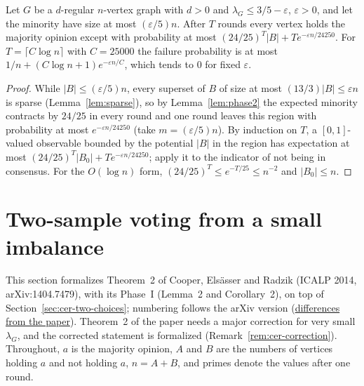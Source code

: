 \begin{theorem}[Theorem~4]\label{thm:expander}
\leanok{}
Let $G$ be a $d$-regular $n$-vertex graph with $d>0$ and $\lambda_G\le3/5-\varepsilon$, $\varepsilon>0$,
and let the minority have size at most $(\varepsilon/5)n$. After $T$ rounds every vertex holds
the majority opinion except with probability at most
$(24/25)^T|B|+Te^{-\varepsilon n/24250}$. For $T=\lceil C\log n\rceil$ with $C=25000$ the failure
probability is at most $1/n+(C\log n+1)e^{-\varepsilon n/C}$, which tends to $0$ for fixed
$\varepsilon$.
\end{theorem}
\begin{proof}\leanok
While $|B|\le(\varepsilon/5)n$, every superset of $B$ of size at most $(13/3)|B|\le\varepsilon n$
is sparse (Lemma~\ref{lem:sparse}), so by Lemma~\ref{lem:phase2} the expected minority contracts by
$24/25$ in every round and one round leaves this region with probability at most
$e^{-\varepsilon n/24250}$ (take $m=(\varepsilon/5)n$). By induction on $T$, a $[0,1]$-valued
observable bounded by the potential $|B|$ in the region has expectation at most
$(24/25)^T|B_0|+Te^{-\varepsilon n/24250}$; apply it to the indicator of not being in consensus.
For the $O(\log n)$ form, $(24/25)^T\le e^{-T/25}\le n^{-2}$ and $|B_0|\le n$.
\end{proof}

\section{Two-sample voting from a small imbalance}\label{sec:cer-small-imbalance}
This section formalizes Theorem~2 of Cooper, Elsässer and Radzik (ICALP 2014, arXiv:1404.7479),
with its Phase~I (Lemma~2 and Corollary~2), on top of
Section~\ref{sec:cer-two-choices}; numbering follows the arXiv version
(\href{https://github.com/formal-dynamics/leanamics/blob/main/median/FORMALIZATION_DIFFERENCES.md#two-sample-voting-on-expanders-from-a-small-imbalance-expandergeneral-roadmap-maj-5-b}{differences
from the paper}). Theorem~2 of the paper needs a major correction for very small $\lambda_G$, and
the corrected statement is formalized (Remark~\ref{rem:cer-correction}). Throughout, $a$ is the
majority opinion, $A$ and $B$ are the numbers of vertices holding $a$ and not holding $a$,
$n=A+B$, and primes denote the values after one round.

